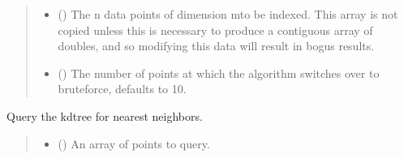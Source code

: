 \documentclass[a4paper,10pt,english]{report}
\begin{document}
\begin{fulllineitems}
\begin{quote}
\begin{description}
\begin{itemize}
\item {} 
\sphinxAtStartPar
{} (\sphinxstyleliteralemphasis{\sphinxupquote{, }}\sphinxstyleliteralemphasis{\sphinxupquote{ (}}\sphinxstyleliteralemphasis{\sphinxupquote{,}}\sphinxstyleliteralemphasis{\sphinxupquote{)}}) \textendash{} The n data points of dimension mto be indexed. This array is 
not copied unless this is necessary to produce a contiguous 
array of doubles, and so modifying this data will result in 
bogus results.

\item {} 
\sphinxAtStartPar
{} (\sphinxstyleliteralemphasis{\sphinxupquote{, }}) \textendash{} The number of points at which the algorithm switches over to
brute\sphinxhyphen{}force, defaults to 10.

\end{itemize}

\end{description}\end{quote}

\begin{fulllineitems}
\label{\detokenize{NNucleate:NNucleate.utils.PeriodicCKDTree.query}}
\pysigstartsignatures
{}
\pysigstopsignatures
\sphinxAtStartPar
Query the kd\sphinxhyphen{}tree for nearest neighbors.
\begin{quote}\begin{description}
\begin{itemize}
\item {} 
\sphinxAtStartPar
{} (\sphinxstyleliteralemphasis{\sphinxupquote{, }}) \textendash{} An array of points to query.


\end{itemize}
\end{description}
\end{quote}
\end{fulllineitems}
\end{fulllineitems}
\end{document}
